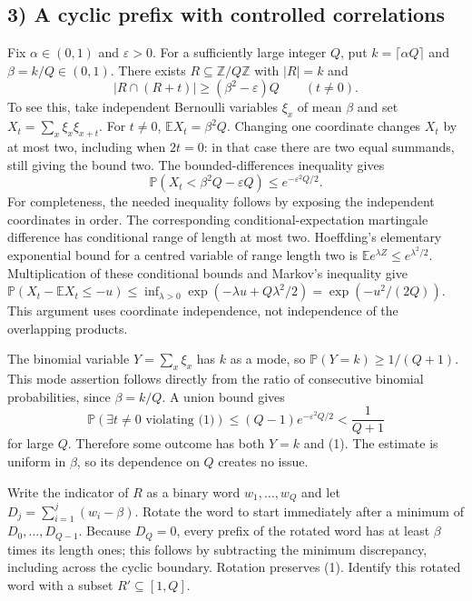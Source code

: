 \subsection*{3) A cyclic prefix with controlled correlations}
Fix $\alpha\in(0,1)$ and $\varepsilon>0$. For a sufficiently large integer $Q$, put $k=\lceil\alpha Q\rceil$ and $\beta=k/Q\in(0,1)$. There exists $R\subseteq\mathbb Z/Q\mathbb Z$ with $|R|=k$ and
\[
 |R\cap(R+t)|\ge(\beta^2-\varepsilon)Q\qquad(t\ne0).
 \tag{1}
\]
To see this, take independent Bernoulli variables $\xi_x$ of mean $\beta$ and set $X_t=\sum_x\xi_x\xi_{x+t}$. For $t\ne0$, $\mathbb EX_t=\beta^2Q$. Changing one coordinate changes $X_t$ by at most two, including when $2t=0$: in that case there are two equal summands, still giving the bound two. The bounded-differences inequality gives
\[
 \mathbb P(X_t<\beta^2Q-\varepsilon Q)\le e^{-\varepsilon^2Q/2}.
\]
For completeness, the needed inequality follows by exposing the independent coordinates in order. The corresponding conditional-expectation martingale difference has conditional range of length at most two. Hoeffding's elementary exponential bound for a centred variable of range length two is $\mathbb E e^{\lambda Z}\le e^{\lambda^2/2}$. Multiplication of these conditional bounds and Markov's inequality give $\mathbb P(X_t-\mathbb EX_t\le-u)\le\inf_{\lambda>0}\exp(-\lambda u+Q\lambda^2/2)=\exp(-u^2/(2Q))$. This argument uses coordinate independence, not independence of the overlapping products.

The binomial variable $Y=\sum_x\xi_x$ has $k$ as a mode, so $\mathbb P(Y=k)\ge1/(Q+1)$. This mode assertion follows directly from the ratio of consecutive binomial probabilities, since $\beta=k/Q$. A union bound gives
\[
 \mathbb P(\exists t\ne0\text{ violating (1)})\le(Q-1)e^{-\varepsilon^2Q/2}<\frac1{Q+1}
\]
for large $Q$. Therefore some outcome has both $Y=k$ and (1). The estimate is uniform in $\beta$, so its dependence on $Q$ creates no issue.

Write the indicator of $R$ as a binary word $w_1,\ldots,w_Q$ and let $D_j=\sum_{i=1}^j(w_i-\beta)$. Rotate the word to start immediately after a minimum of $D_0,\ldots,D_{Q-1}$. Because $D_Q=0$, every prefix of the rotated word has at least $\beta$ times its length ones; this follows by subtracting the minimum discrepancy, including across the cyclic boundary. Rotation preserves (1). Identify this rotated word with a subset $R'\subseteq[1,Q]$.

